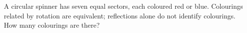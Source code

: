 A circular spinner has seven equal sectors, each coloured red or blue. Colourings related by rotation are equivalent; reflections alone do not identify colourings. How many colourings are there?
